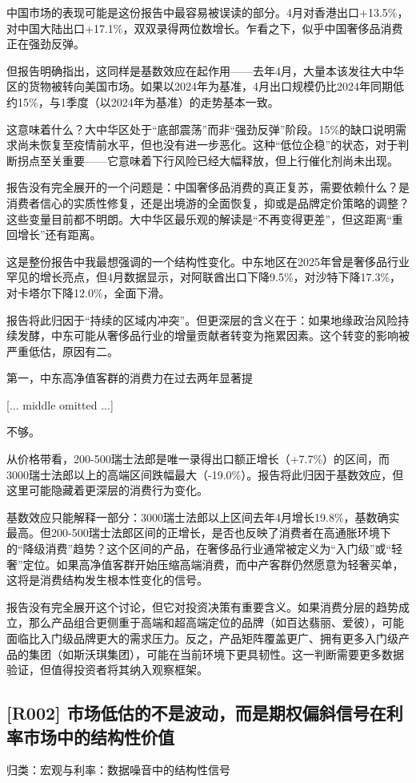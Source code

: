 \documentclass[11pt]{ctexart}
\begin{document}
中国市场的表现可能是这份报告中最容易被误读的部分。4月对香港出口+13.5\%，对中国大陆出口+17.1\%，双双录得两位数增长。乍看之下，似乎中国奢侈品消费正在强劲反弹。

但报告明确指出，这同样是基数效应在起作用——去年4月，大量本该发往大中华区的货物被转向美国市场。如果以2024年为基准，4月出口规模仍比2024年同期低约15\%，与1季度（以2024年为基准）的走势基本一致。

这意味着什么？大中华区处于“底部震荡”而非“强劲反弹”阶段。15\%的缺口说明需求尚未恢复至疫情前水平，但也没有进一步恶化。这种“低位企稳”的状态，对于判断拐点至关重要——它意味着下行风险已经大幅释放，但上行催化剂尚未出现。

报告没有完全展开的一个问题是：中国奢侈品消费的真正复苏，需要依赖什么？是消费者信心的实质性修复，还是出境游的全面恢复，抑或是品牌定价策略的调整？这些变量目前都不明朗。大中华区最乐观的解读是“不再变得更差”，但这距离“重回增长”还有距离。

这是整份报告中我最想强调的一个结构性变化。中东地区在2025年曾是奢侈品行业罕见的增长亮点，但4月数据显示，对阿联酋出口下降9.5\%，对沙特下降17.3\%，对卡塔尔下降12.0\%，全面下滑。

报告将此归因于“持续的区域内冲突”。但更深层的含义在于：如果地缘政治风险持续发酵，中东可能从奢侈品行业的增量贡献者转变为拖累因素。这个转变的影响被严重低估，原因有二。

第一，中东高净值客群的消费力在过去两年显著提

[... middle omitted ...]

不够。

从价格带看，200-500瑞士法郎是唯一录得出口额正增长（+7.7\%）的区间，而3000瑞士法郎以上的高端区间跌幅最大（-19.0\%）。报告将此归因于基数效应，但这里可能隐藏着更深层的消费行为变化。

基数效应只能解释一部分：3000瑞士法郎以上区间去年4月增长19.8\%，基数确实最高。但200-500瑞士法郎区间的正增长，是否也反映了消费者在高通胀环境下的“降级消费”趋势？这个区间的产品，在奢侈品行业通常被定义为“入门级”或“轻奢”定位。如果高净值客群开始压缩高端消费，而中产客群仍然愿意为轻奢买单，这将是消费结构发生根本性变化的信号。

报告没有完全展开这个讨论，但它对投资决策有重要含义。如果消费分层的趋势成立，那么产品组合更侧重于高端和超高端定位的品牌（如百达翡丽、爱彼），可能面临比入门级品牌更大的需求压力。反之，产品矩阵覆盖更广、拥有更多入门级产品的集团（如斯沃琪集团），可能在当前环境下更具韧性。这一判断需要更多数据验证，但值得投资者将其纳入观察框架。

\subsection{[R002] 市场低估的不是波动，而是期权偏斜信号在利率市场中的结构性价值}
{\small\color{refgray}归类：宏观与利率：数据噪音中的结构性信号}
\end{document}
